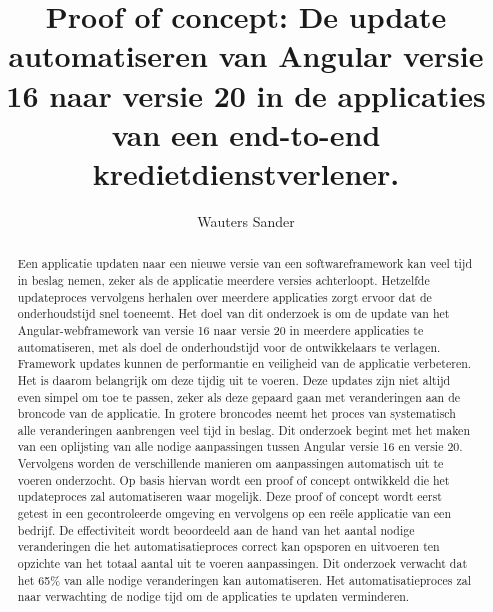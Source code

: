 \documentclass{hogent-article}
\title{Proof of concept: De update automatiseren van Angular versie 16 naar versie 20 in de applicaties van een end-to-end kredietdienstverlener.}
\author{Wauters Sander}
\begin{document}
\begin{abstract}

Een applicatie updaten naar een nieuwe versie van een softwareframework kan veel tijd in beslag nemen, zeker als de applicatie meerdere versies achterloopt.
Hetzelfde updateproces vervolgens herhalen over meerdere applicaties zorgt ervoor dat de onderhoudstijd snel toeneemt.
Het doel van dit onderzoek is om de update van het Angular-webframework van versie 16 naar versie 20 in meerdere applicaties te automatiseren, met als doel de onderhoudstijd voor de ontwikkelaars te verlagen.
Framework updates kunnen de performantie en veiligheid van de applicatie verbeteren.
Het is daarom belangrijk om deze tijdig uit te voeren.
Deze updates zijn niet altijd even simpel om toe te passen, zeker als deze gepaard gaan met veranderingen aan de broncode van de applicatie.
In grotere broncodes neemt het proces van systematisch alle veranderingen aanbrengen veel tijd in beslag.
Dit onderzoek begint met het maken van een oplijsting van alle nodige aanpassingen tussen Angular versie 16 en versie 20.
Vervolgens worden de verschillende manieren om aanpassingen automatisch uit te voeren onderzocht.
Op basis hiervan wordt een proof of concept ontwikkeld die het updateproces zal automatiseren waar mogelijk.
Deze proof of concept wordt eerst getest in een gecontroleerde omgeving en vervolgens op een reële applicatie van een bedrijf.
De effectiviteit wordt beoordeeld aan de hand van het aantal nodige veranderingen die het automatisatieproces correct kan opsporen en uitvoeren ten opzichte van het totaal aantal uit te voeren aanpassingen.
Dit onderzoek verwacht dat het 65\% van alle nodige veranderingen kan automatiseren.
Het automatisatieproces zal naar verwachting de nodige tijd om de applicaties te updaten verminderen.

\end{abstract}

\tableofcontents



\printbibliography[heading=bibintoc]
\end{document}
